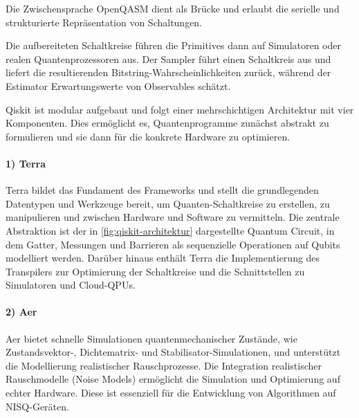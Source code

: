 Die Zwischensprache OpenQASM dient als Brücke und erlaubt die serielle und strukturierte Repräsentation von Schaltungen. \autocite{crossOpenQuantumAssembly2017a}

Die aufbereiteten Schaltkreise führen die Primitives dann auf Simulatoren oder realen Quantenprozessoren aus. Der Sampler führt einen Schaltkreis aus und liefert die resultierenden Bitstring-Wahrscheinlichkeiten zurück, während der Estimator Erwartungswerte von Observables schätzt.

Qiskit ist modular aufgebaut und folgt einer mehrschichtigen Architektur mit vier Komponenten. Dies ermöglicht es, Quantenprogramme zunächst abstrakt zu formulieren und sie dann für die konkrete Hardware zu optimieren. \autocite{javadi-abhariQuantumComputingQiskit2024a}
\\

\paragraph{1) Terra}
Terra bildet das Fundament des Frameworks und stellt die grundlegenden Datentypen und Werkzeuge bereit, um Quanten-Schaltkreise zu erstellen, zu manipulieren und zwischen Hardware und Software zu vermitteln. Die zentrale Abstraktion ist der in \autoref{fig:qiskit-architektur} dargestellte Quantum Circuit, in dem Gatter, Messungen und Barrieren als sequenzielle Operationen auf Qubits modelliert werden. Darüber hinaus enthält Terra die Implementierung des Transpilers zur Optimierung der Schaltkreise und die Schnittstellen zu Simulatoren und Cloud-QPUs. \autocite{javadi-abhariQuantumComputingQiskit2024a}
\\

\paragraph{2) Aer}
Aer bietet schnelle Simulationen quantenmechanischer Zustände, wie Zustands\-vektor\mbox{-}, Dichtematrix- und Stabilisator-Simulationen, und unterstützt die Modellierung realistischer Rauschprozesse. Die Integration realistischer Rauschmodelle (Noise Models) ermöglicht die Simulation und Optimierung auf echter Hardware. Diese ist essenziell für die Entwicklung von Algorithmen auf NISQ-Geräten. \autocite{javadi-abhariQuantumComputingQiskit2024a}
\\

